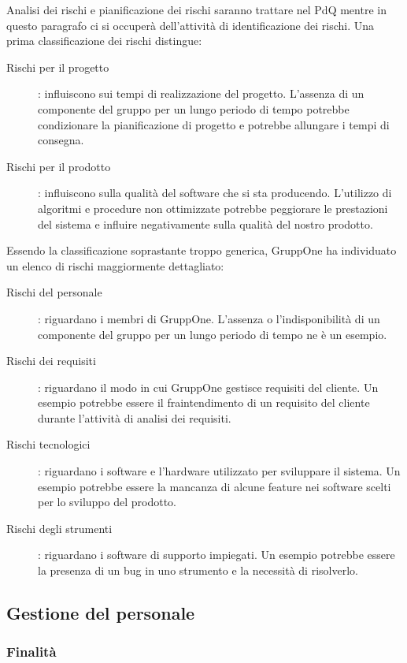 \documentclass[../norme-di-progetto.tex]{subfiles}
\begin{document}
Analisi dei rischi e pianificazione dei rischi saranno trattare nel PdQ mentre in questo paragrafo ci si occuperà dell'attività di identificazione dei rischi.
Una prima classificazione dei rischi distingue:

\begin{description}
  \item [Rischi per il progetto]: influiscono sui tempi di realizzazione del progetto. L'assenza di un componente del gruppo per un lungo periodo di tempo potrebbe condizionare la pianificazione di progetto e potrebbe allungare i tempi di consegna.
  \item [Rischi per il prodotto]: influiscono sulla qualità del software che si sta producendo. L'utilizzo di algoritmi e procedure non ottimizzate potrebbe peggiorare le prestazioni del sistema e influire negativamente sulla qualità del nostro prodotto.
\end{description}
Essendo la classificazione soprastante troppo generica, GruppOne ha individuato un elenco di rischi maggiormente dettagliato:
\begin{description}
  \item [Rischi del personale]: riguardano i membri di GruppOne. L'assenza o l'indisponibilità di un componente del gruppo per un lungo periodo di tempo ne è un esempio.
  \item [Rischi dei requisiti]: riguardano il modo in cui GruppOne gestisce requisiti del cliente. Un esempio potrebbe essere il fraintendimento di un requisito del cliente durante l'attività di analisi dei requisiti.
  \item [Rischi tecnologici]: riguardano i software e l'hardware utilizzato per sviluppare il sistema. Un esempio potrebbe essere la mancanza di alcune feature nei software scelti per lo sviluppo del prodotto.
  \item [Rischi degli strumenti]: riguardano i software di supporto impiegati. Un esempio potrebbe essere la presenza di un bug in uno strumento e la necessità di risolverlo.
\end{description}

\subsection{Gestione del personale}%
\label{sub:gestione_del_personale}

\subsubsection{Finalità}%
\label{subs:Gestione_del_personale/finalita}
\end{document}
